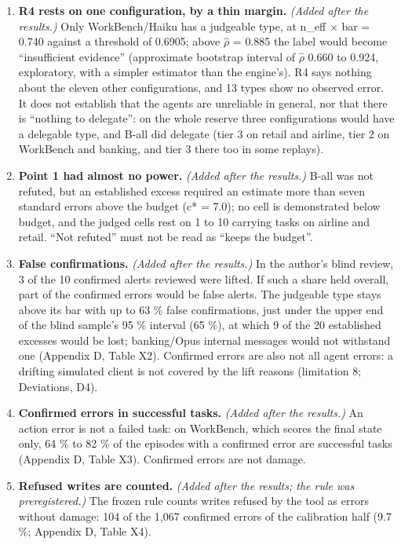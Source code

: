 \begin{enumerate}
\item
  \textbf{R4 rests on one configuration, by a thin margin.} \emph{(Added after the results.)} Only WorkBench/Haiku has a judgeable type, at n\_eff × bar = 0.740 against a threshold of 0.6905; above \ensuremath{\hat{\rho}} = 0.885 the label would become ``insufficient evidence'' (approximate bootstrap interval of \ensuremath{\hat{\rho}} 0.660 to 0.924, exploratory, with a simpler estimator than the engine's). R4 says nothing about the eleven other configurations, and 13 types show no observed error. It does not establish that the agents are unreliable in general, nor that there is ``nothing to delegate'': on the whole reserve three configurations would have a delegable type, and B-all did delegate (tier 3 on retail and airline, tier 2 on WorkBench and banking, and tier 3 there too in some replays).
\item
  \textbf{Point 1 had almost no power.} \emph{(Added after the results.)} B-all was not refuted, but an established excess required an estimate more than seven standard errors above the budget (c* = 7.0); no cell is demonstrated below budget, and the judged cells rest on 1 to 10 carrying tasks on airline and retail. ``Not refuted'' must not be read as ``keeps the budget''.
\item
  \textbf{False confirmations.} \emph{(Added after the results.)} In the author's blind review, 3 of the 10 confirmed alerts reviewed were lifted. If such a share held overall, part of the confirmed errors would be false alerts. The judgeable type stays above its bar with up to 63 \% false confirmations, just under the upper end of the blind sample's 95 \% interval (65 \%), at which 9 of the 20 established excesses would be lost; banking/Opus internal messages would not withstand one (Appendix D, Table X2). Confirmed errors are also not all agent errors: a drifting simulated client is not covered by the lift reasons (limitation 8; Deviations, D4).
\item
  \textbf{Confirmed errors in successful tasks.} \emph{(Added after the results.)} An action error is not a failed task: on WorkBench, which scores the final state only, 64 \% to 82 \% of the episodes with a confirmed error are successful tasks (Appendix D, Table X3). Confirmed errors are not damage.
\item
  \textbf{Refused writes are counted.} \emph{(Added after the results; the rule was preregistered.)} The frozen rule counts writes refused by the tool as errors without damage: 104 of the 1,067 confirmed errors of the calibration half (9.7 \%; Appendix D, Table X4).

\end{enumerate}
